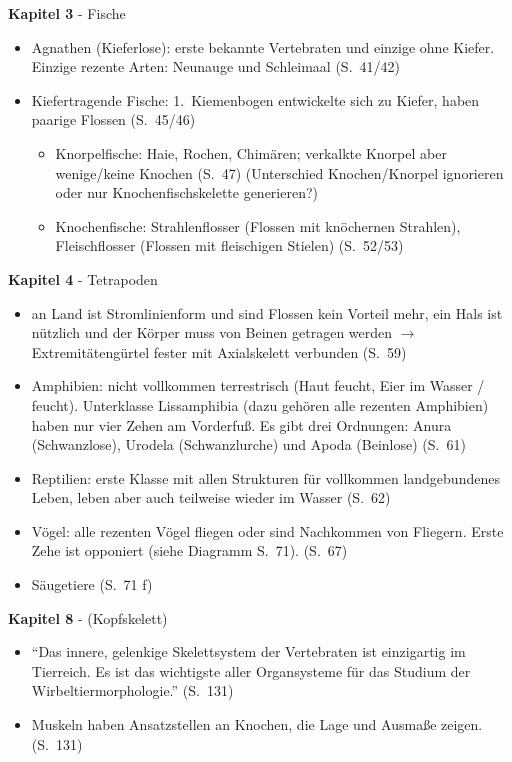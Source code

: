 \textbf{Kapitel 3} - Fische
\begin{itemize}
 \item Agnathen (Kieferlose): erste bekannte Vertebraten und einzige ohne Kiefer. Einzige rezente Arten: Neunauge und Schleimaal (S.\ 41/42)
 \item Kiefertragende Fische: 1.\ Kiemenbogen entwickelte sich zu Kiefer, haben paarige Flossen (S.\ 45/46)
 \begin{itemize}
  \item Knorpelfische: Haie, Rochen, Chimären; verkalkte Knorpel aber wenige/keine Knochen (S.\ 47) (Unterschied Knochen/Knorpel ignorieren oder nur Knochenfischskelette generieren?)
  \item Knochenfische: Strahlenflosser (Flossen mit knöchernen Strahlen), Fleischflosser (Flossen mit fleischigen Stielen) (S.\ 52/53)
 \end{itemize}
\end{itemize}

\textbf{Kapitel 4} - Tetrapoden
\begin{itemize}
 \item an Land ist Stromlinienform und sind Flossen kein Vorteil mehr, ein Hals ist nützlich und der Körper muss von Beinen getragen werden $\rightarrow$ Extremitätengürtel fester mit Axialskelett verbunden (S.\ 59)
 \item Amphibien: nicht vollkommen terrestrisch (Haut feucht, Eier im Wasser / feucht). Unterklasse Lissamphibia (dazu gehören alle rezenten Amphibien) haben nur vier Zehen am Vorderfuß. Es gibt drei Ordnungen: Anura (Schwanzlose), Urodela (Schwanzlurche) und Apoda (Beinlose) (S.\ 61)
 \item Reptilien: erste Klasse mit allen Strukturen für vollkommen landgebundenes Leben, leben aber auch teilweise wieder im Wasser (S.\ 62)
 \item Vögel: alle rezenten Vögel fliegen oder sind Nachkommen von Fliegern. Erste Zehe ist opponiert (siehe Diagramm S.\ 71). (S.\ 67)
 \item Säugetiere (S.\ 71 f)
\end{itemize}

\textbf{Kapitel 8} - (Kopfskelett)
\begin{itemize}
 \item "`Das innere, gelenkige Skelettsystem der Vertebraten ist einzigartig im Tierreich. Es ist das wichtigste aller Organsysteme für das Studium der Wirbeltiermorphologie."' (S.\ 131)
 \item Muskeln haben Ansatzstellen an Knochen, die Lage und Ausmaße zeigen. (S.\ 131)
\end{itemize}

